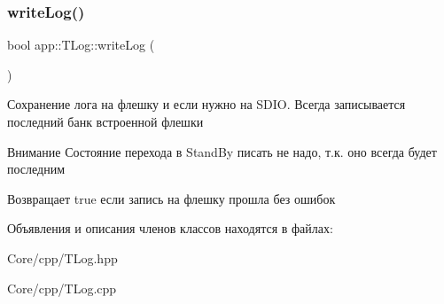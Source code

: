 \subsubsection{\texorpdfstring{write\+Log()}{writeLog()}}
{\footnotesize\ttfamily bool app\+::\+T\+Log\+::write\+Log (\begin{DoxyParamCaption}{ }\end{DoxyParamCaption})}



Сохранение лога на флешку и если нужно на S\+D\+IO. Всегда записывается последний банк встроенной флешки 



 \begin{DoxyAttention}{Внимание}
Состояние перехода в Stand\+By писать не надо, т.\+к. оно всегда будет последним 
\end{DoxyAttention}
\begin{DoxyReturn}{Возвращает}
true если запись на флешку прошла без ошибок 
\end{DoxyReturn}


Объявления и описания членов классов находятся в файлах\+:\begin{DoxyCompactItemize}
\item 
Core/cpp/T\+Log.\+hpp\item 
Core/cpp/T\+Log.\+cpp\end{DoxyCompactItemize}
